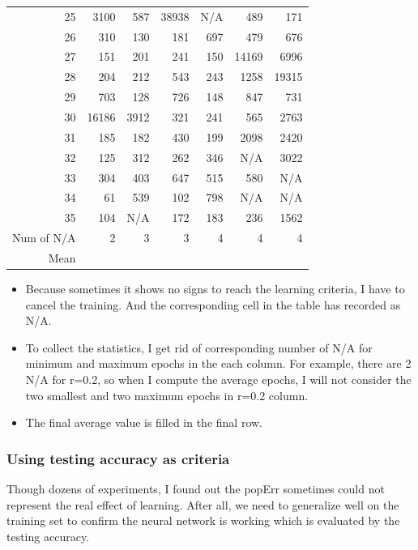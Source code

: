 \documentclass[11pt]{article}
\begin{document}
\begin{table}[htb]
\begin{tabular}{rrrrrrr}
25 & 3100 & 587 & 38938 & N/A & 489 & 171\\
26 & 310 & 130 & 181 & 697 & 479 & 676\\
27 & 151 & 201 & 241 & 150 & 14169 & 6996\\
28 & 204 & 212 & 543 & 243 & 1258 & 19315\\
29 & 703 & 128 & 726 & 148 & 847 & 731\\
30 & 16186 & 3912 & 321 & 241 & 565 & 2763\\
31 & 185 & 182 & 430 & 199 & 2098 & 2420\\
32 & 125 & 312 & 262 & 346 & N/A & 3022\\
33 & 304 & 403 & 647 & 515 & 580 & N/A\\
34 & 61 & 539 & 102 & 798 & N/A & N/A\\
35 & 104 & N/A & 172 & 183 & 236 & 1562\\
\hline
Num of N/A & 2 & 3 & 3 & 4 & 4 & 4\\
Mean &  &  &  &  &  & \\
\end{tabular}
\end{table}

\begin{itemize}
\item Because sometimes it shows no signs to reach the learning criteria, I have to cancel the training. And the corresponding cell in the table has recorded as N/A.
\item To collect the statistics, I get rid of corresponding number of N/A for minimum and maximum epochs in the each column. For example, there are 2 N/A for r=0.2, so when I compute the average epochs, I will not consider the two smallest and two maximum epochs in r=0.2 column.
\item The final average value is filled in the final row.
\end{itemize}


\subsubsection{Using testing accuracy as criteria}
\label{sec-3-1-1}
Though dozens of experiments, I found out the popErr sometimes could not represent the real effect of learning. After all, we need to generalize well on the training set to confirm the neural network is working which is evaluated by the testing accuracy.  
\end{document}
